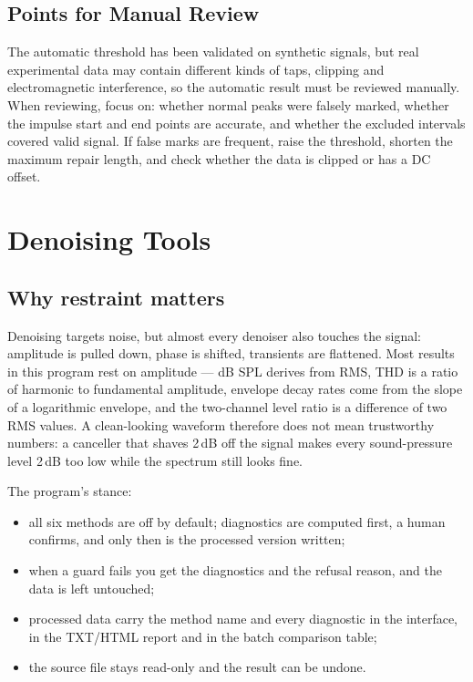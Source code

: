 \documentclass[UTF8,a4paper,12pt]{ctexart}
\begin{document}
\subsection{Points for Manual Review}

The automatic threshold has been validated on synthetic signals, but real experimental data may contain different kinds of taps, clipping and electromagnetic interference, so the automatic result must be reviewed manually. When reviewing, focus on: whether normal peaks were falsely marked, whether the impulse start and end points are accurate, and whether the excluded intervals covered valid signal. If false marks are frequent, raise the threshold, shorten the maximum repair length, and check whether the data is clipped or has a DC offset.

\section{Denoising Tools}

\subsection{Why restraint matters}

Denoising targets noise, but almost every denoiser also touches the signal: amplitude is pulled down, phase is shifted, transients are flattened. Most results in this program rest on amplitude --- dB SPL derives from RMS, THD is a ratio of harmonic to fundamental amplitude, envelope decay rates come from the slope of a logarithmic envelope, and the two-channel level ratio is a difference of two RMS values. A clean-looking waveform therefore does not mean trustworthy numbers: a canceller that shaves 2\,dB off the signal makes every sound-pressure level 2\,dB too low while the spectrum still looks fine.

The program's stance:

\begin{itemize}[leftmargin=2em]
  \item all six methods are off by default; diagnostics are computed first, a human confirms, and only then is the processed version written;
  \item when a guard fails you get the diagnostics and the refusal reason, and the data is left untouched;
  \item processed data carry the method name and every diagnostic in the interface, in the TXT/HTML report and in the batch comparison table;
  \item the source file stays read-only and the result can be undone.
\end{itemize}
\end{document}
